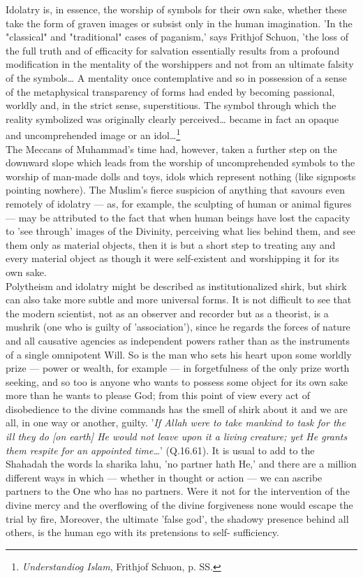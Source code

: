 \documentclass[11pt, b5paper, twoside]{book}
\begin{document}
Idolatry is, in essence, the worship of symbols for their own sake, whether these take the form of 
graven images or subsist only in the human imagination. 'In the "classical" and "traditional" cases 
of paganism,' says Frithjof Schuon, 'the loss of the full truth and of efficacity for salvation 
essentially results from a profound modification in the mentality of the worshippers and not from an 
ultimate falsity of the symbols\ldots{} A mentality once contemplative and so in possession of a sense of 
the metaphysical transparency of forms had ended by becoming passional, worldly and, in the strict 
sense, superstitious. The symbol through which the reality symbolized was originally clearly 
perceived\ldots{} became in fact an opaque and uncomprehended image or an idol\ldots{}\footnote{\emph{Understandiog Islam}, Frithjof Schuon, p. SS.} \\

The Meccans of Muhammad's time had, however, taken a further step on the downward slope which leads 
from the worship of uncomprehended symbols to the worship of man-made dolls and toys, idols which 
represent nothing (like signposts pointing nowhere). The Muslim's fierce suspicion of anything that 
savours even remotely of idolatry --- as, for example, the sculpting of human or animal figures --- may 
be attributed to the fact that when human beings have lost the capacity to 'see through' images of 
the Divinity, perceiving what lies behind them, and see them only as material objects, then it is but 
a short step to treating any and every material object as though it were self-existent and 
worshipping it for its own sake. \\

Polytheism and idolatry might be described as institutionalized shirk, but shirk can also take more 
subtle and more universal forms. It is not difficult to see that the modern scientist, not as an 
observer and recorder but as a theorist, is a mushrik (one who is guilty of 'association'), since he 
regards the forces of nature and all causative agencies as independent powers rather than as the 
instruments of a single omnipotent Will. So is the man who sets his heart upon some worldly prize --- 
power or wealth, for example --- in forgetfulness of the only prize worth seeking, and so too is anyone 
who wants to possess some object for its own sake more than he wants to please God; from this point 
of view every act of disobedience to the divine commands has the smell of shirk about it and we are 
all, in one way or another, guilty. '\emph{If Allah were to take mankind to task for the ill they do [on 
earth] He would not leave upon it a living creature; yet He grants them respite for an appointed 
time\ldots{}}' (Q.16.61). It is usual to add to the Shahadah the words la sharika lahu, 'no partner hath 
He,' and there are a million different ways in which --- whether in thought or action --- we can ascribe 
partners to the One who has no partners. Were it not for the intervention of the divine mercy and the 
overflowing of the divine forgiveness none would escape the trial by fire, Moreover, the ultimate 
'false god', the shadowy presence behind all others, is the human ego with its pretensions to self-
sufficiency. \\
\end{document}
